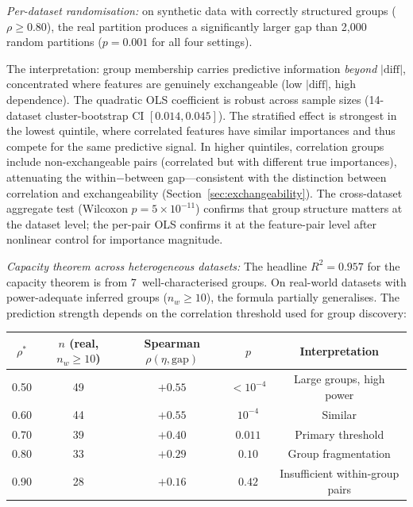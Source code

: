 \documentclass[11pt,a4paper]{article}
\begin{document}
\emph{Per-dataset randomisation:} on synthetic data with correctly structured groups ($\rho \geq 0.80$), the real partition produces a significantly larger gap than 2{,}000 random partitions ($p = 0.001$ for all four settings).

The interpretation: group membership carries predictive information \emph{beyond} $|\text{diff}|$, concentrated where features are genuinely exchangeable (low $|\text{diff}|$, high dependence).  The quadratic OLS coefficient is robust across sample sizes (14-dataset cluster-bootstrap CI $[0.014, 0.045]$).  The stratified effect is strongest in the lowest quintile, where correlated features have similar importances and thus compete for the same predictive signal.  In higher quintiles, correlation groups include non-exchangeable pairs (correlated but with different true importances), attenuating the within$-$between gap---consistent with the distinction between correlation and exchangeability (Section~\ref{sec:exchangeability}).  The cross-dataset aggregate test (Wilcoxon $p = 5 \times 10^{-11}$) confirms that group structure matters at the dataset level; the per-pair OLS confirms it at the feature-pair level after nonlinear control for importance magnitude.

\emph{Capacity theorem across heterogeneous datasets:}  The headline $R^2 = 0.957$ for the capacity theorem is from 7~well-characterised groups.  On real-world datasets with power-adequate inferred groups ($n_w \geq 10$), the formula partially generalises.  The prediction strength depends on the correlation threshold used for group discovery:

\begin{center}
\small
\begin{tabular}{@{}ccccc@{}}
\toprule
$\rho^*$ & $n$ (real, $n_w \geq 10$) & Spearman $\rho(\eta, \text{gap})$ & $p$ & Interpretation \\
\midrule
0.50 & 49 & $+0.55$ & $< 10^{-4}$ & Large groups, high power \\
0.60 & 44 & $+0.55$ & $10^{-4}$ & Similar \\
0.70 & 39 & $+0.40$ & $0.011$ & Primary threshold \\
0.80 & 33 & $+0.29$ & $0.10$ & Group fragmentation \\
0.90 & 28 & $+0.16$ & $0.42$ & Insufficient within-group pairs \\
\bottomrule
\end{tabular}
\end{center}
\end{document}
